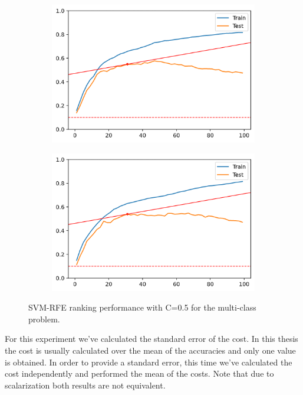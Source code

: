 \begin{figure}[h]
\begin{subfigure}[b]{0.4\linewidth}
        \includegraphics[width=\linewidth]{img/ch5/multi/w-l3.png}
    \end{subfigure}
    \begin{subfigure}[b]{0.4\linewidth}
        \includegraphics[width=\linewidth]{img/ch5/multi/w-coef.png}
    \end{subfigure}
    \caption[Multi-class criteria: Comparison with artificial data]{SVM-RFE ranking performance with C=0.5 for the multi-class problem.}
    \label{fig:ch5.multi.plot1}
\end{figure}

For this experiment we've calculated the standard error of the cost. In this thesis the cost is usually calculated over the mean of the accuracies and only one value is obtained. In order to provide a standard error, this time we've calculated the cost independently and performed the mean of the costs. Note that due to scalarization both results are not equivalent.

